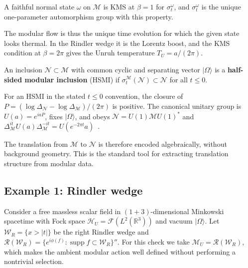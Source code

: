 \begin{theorem}
\label{thm:KMS-unique}
A faithful normal state $\omega$ on $\mathcal{M}$ is KMS at $\beta = 1$ for $\sigma_t^\omega$, and $\sigma_t^\omega$ is the unique one-parameter automorphism group with this property.
\end{theorem}

The modular flow is thus the unique time evolution for which the given state looks thermal. In the Rindler wedge it is the Lorentz boost, and the KMS condition at $\beta = 2\pi$ gives the Unruh temperature $T_U = a/(2\pi)$.

\begin{definition}
An inclusion $\mathcal{N} \subset \mathcal{M}$ with common cyclic and separating vector $|\Omega\rangle$ is a \textbf{half-sided modular inclusion} (HSMI) if $\sigma_t^{\mathcal{M}}(\mathcal{N}) \subset \mathcal{N}$ for all $t \leq 0$.
\end{definition}

\begin{theorem}
\label{thm:Wiesbrock}
For an HSMI in the stated $t\le0$ convention, the closure of
$P=(\log\Delta_{\mathcal N}-\log\Delta_{\mathcal M})/(2\pi)$ is positive. The canonical
unitary group is $U(a)=e^{iaP}$, fixes $|\Omega\rangle$, and obeys
$\mathcal N=U(1)\mathcal M U(1)^*$ and
$\Delta_{\mathcal M}^{it}U(a)\Delta_{\mathcal M}^{-it}=U(e^{-2\pi t}a)$~\cite[Thm.~2.1]{ArakiZsido2005}.
\end{theorem}

The translation from $\mathcal M$ to $\mathcal N$ is therefore encoded algebraically, without background geometry. This is the standard tool for extracting translation structure from modular data.


\subsection{Example 1: Rindler wedge}
\label{sec:rindler}

Consider a free massless scalar field in $(1+3)$-dimensional Minkowski spacetime with Fock space $\mathcal{H}_U = \mathcal{F}(L^2(\mathbb{R}^3))$ and vacuum $|\Omega\rangle$. Let $\mathcal{W}_R = \{x > |t|\}$ be the right Rindler wedge and $\mathcal{R}(\mathcal{W}_R) = \{e^{i\phi(f)} : \operatorname{supp} f \subset \mathcal{W}_R\}''$. For this check we take $\mathcal M_U=\mathcal R(\mathcal W_R)$, which makes the ambient modular action well defined without performing a nontrivial selection.

